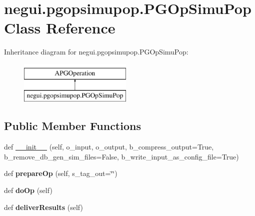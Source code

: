 \hypertarget{classnegui_1_1pgopsimupop_1_1PGOpSimuPop}{}\section{negui.\+pgopsimupop.\+P\+G\+Op\+Simu\+Pop Class Reference}
\label{classnegui_1_1pgopsimupop_1_1PGOpSimuPop}
Inheritance diagram for negui.\+pgopsimupop.\+P\+G\+Op\+Simu\+Pop\+:\begin{figure}[H]
\begin{center}
\leavevmode
\includegraphics[height=2.000000cm]{classnegui_1_1pgopsimupop_1_1PGOpSimuPop}
\end{center}
\end{figure}
\subsection*{Public Member Functions}
\begin{DoxyCompactItemize}
\item 
def \hyperlink{classnegui_1_1pgopsimupop_1_1PGOpSimuPop_a6548b8996f7ace76266e629d9ff8c11e}{\+\_\+\+\_\+init\+\_\+\+\_\+} (self, o\+\_\+input, o\+\_\+output, b\+\_\+compress\+\_\+output=True, b\+\_\+remove\+\_\+db\+\_\+gen\+\_\+sim\+\_\+files=False, b\+\_\+write\+\_\+input\+\_\+as\+\_\+config\+\_\+file=True)
\item 
def {\bfseries prepare\+Op} (self, s\+\_\+tag\+\_\+out=\char`\"{}\char`\"{})\hypertarget{classnegui_1_1pgopsimupop_1_1PGOpSimuPop_a2f255ee2acb3d3f0341cc2f7cf1e3ad3}{}\label{classnegui_1_1pgopsimupop_1_1PGOpSimuPop_a2f255ee2acb3d3f0341cc2f7cf1e3ad3}

\item 
def {\bfseries do\+Op} (self)\hypertarget{classnegui_1_1pgopsimupop_1_1PGOpSimuPop_aed657d7d631aa0e8c2f40f8411c95dcd}{}\label{classnegui_1_1pgopsimupop_1_1PGOpSimuPop_aed657d7d631aa0e8c2f40f8411c95dcd}

\item 
def {\bfseries deliver\+Results} (self)\hypertarget{classnegui_1_1pgopsimupop_1_1PGOpSimuPop_a35c9e5794e68274f42147644b2e968c5}{}\label{classnegui_1_1pgopsimupop_1_1PGOpSimuPop_a35c9e5794e68274f42147644b2e968c5}

\end{DoxyCompactItemize}
